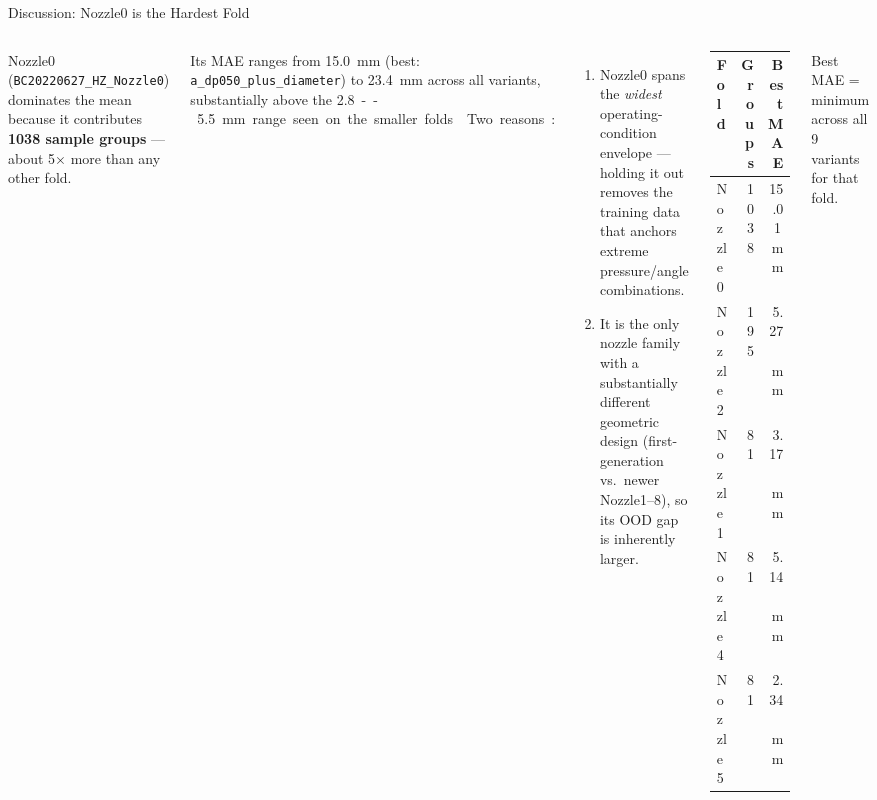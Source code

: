 \documentclass[UTF8,aspectratio=169]{ctexbeamer}
\begin{document}
\begin{frame}{Discussion: Nozzle0 is the Hardest Fold}
\small
\begin{columns}[T]
Nozzle0 (\texttt{BC20220627\_HZ\_Nozzle0}) dominates the mean because it contributes
\textbf{1038 sample groups} --- about 5$\times$ more than any other fold.

\vspace{0.5em}
Its MAE ranges from \SI{15.0}{mm} (best: \texttt{a\_dp050\_plus\_diameter}) to \SI{23.4}{mm}
across all variants, substantially above the \SI{2.8}--\SI{5.5}{mm} range seen on the smaller
folds.

\vspace{0.5em}
Two reasons:
\begin{enumerate}
  \item Nozzle0 spans the \emph{widest} operating-condition envelope --- holding it out removes
        the training data that anchors extreme pressure/angle combinations.
  \item It is the only nozzle family with a substantially different geometric design
        (first-generation vs.\ newer Nozzle1--8), so its OOD gap is inherently larger.
\end{enumerate}

\begin{center}
\renewcommand{\arraystretch}{1.2}
\small
\begin{tabular}{@{}lrr@{}}
\toprule
\textbf{Fold} & \textbf{Groups} & \textbf{Best MAE} \\
\midrule
Nozzle0 & 1038 & 15.01\,mm \\
Nozzle2 & 195  & 5.27\,mm \\
Nozzle1 & 81   & 3.17\,mm \\
Nozzle4 & 81   & 5.14\,mm \\
Nozzle5 & 81   & 2.34\,mm \\
\bottomrule
\end{tabular}
\end{center}
\vspace{0.5em}
\footnotesize
Best MAE = minimum across all 9 variants for that fold.
\end{columns}
\end{frame}
\end{document}
